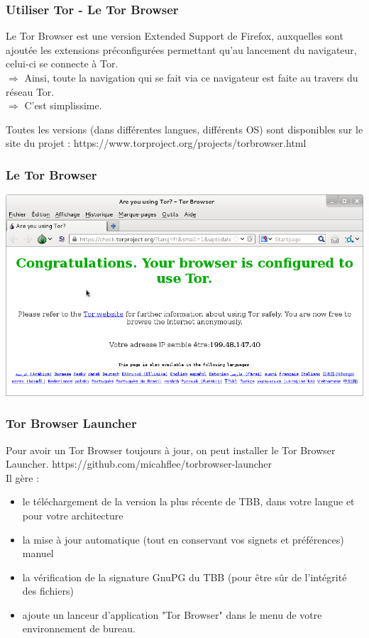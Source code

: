 \begin{frame}
\frametitle{Utiliser Tor - Le Tor Browser}

Le Tor Browser est une version Extended Support de Firefox, auxquelles sont ajoutée les extensions préconfigurées permettant qu’au lancement du navigateur, celui-ci se connecte à Tor. 
\\$\Rightarrow$  Ainsi, toute la navigation qui se fait via ce navigateur est faite au travers du réseau Tor. 
\\$\Rightarrow$ C’est simplissime.

Toutes les versions (dans différentes langues, différents OS) sont disponibles sur le site du projet : https://www.torproject.org/projects/torbrowser.html
\end{frame}

\begin{frame}
\frametitle{Le Tor Browser}
\begin{center}
\includegraphics[keepaspectratio,width=\textwidth, height=.8\textheight]{./materials/tbb}
\end{center}
\end{frame}

\begin{frame}
\frametitle{Tor Browser Launcher}
Pour avoir un Tor Browser toujours à jour, on peut installer le Tor Browser Launcher.
https://github.com/micahflee/torbrowser-launcher
\\
Il gère : 
\begin{itemize}
\item le téléchargement de la version la plus récente de TBB, dans votre langue et pour votre architecture
\item la mise à jour automatique (tout en conservant vos signets et préférences) manuel
\item la vérification de la signature GnuPG du TBB (pour être sûr de l’intégrité des fichiers)
\item ajoute un lanceur d’application "Tor Browser" dans le menu de votre environnement de bureau.
\end{itemize}
\end{frame}

